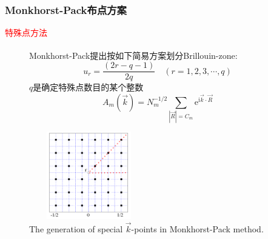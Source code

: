 \documentclass[cjk,slidestop,compress,mathserif,blue]{beamer}
\newcommand{\upcite}[1]{\hspace{0ex}\textsuperscript{\cite{#1}}} %
\begin{document}
\frame
{
	\frametitle{\textrm{Monkhorst-Pack}布点方案}
	\textcolor{red}{特殊点方法}
\begin{figure}[h!]
\begin{minipage}[t]{0.52\linewidth}
	\textrm{Monkhorst-Pack}提出按如下简易方案划分\textrm{Brillouin-zone}\upcite{PRB13-5188_1976}:
			$$\boxed{u_r=\dfrac{(2r-q-1)}{2q}\quad(r=1,2,3,\cdots,q)}$$
			$q$是确定特殊点数目的某个整数
			\vspace{-0.1in}
			$$A_m(\vec k)=N_m^{-1/2}\sum_{|\vec R|=C_m}\mathrm{e}^{\mathrm{i}\vec k\cdot\vec R}$$
\end{minipage}
\hfill
\begin{minipage}[t]{0.42\linewidth}
\centering
\vspace*{-0.6in}
\includegraphics[height=1.5in,width=2.05in,viewport=-200 0 850 800,clip]{Figures/Special-points-MP.png}
\caption{\small \textrm{The generation of special $\vec k$-points in \textrm{Monkhorst-Pack} method.}}%
\label{Special-points-MP}
\end{minipage}
\end{figure} 
	
}
\end{document}
